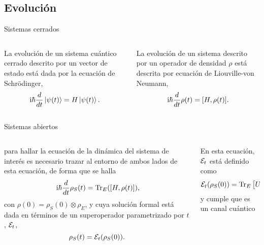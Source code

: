 \subsection{Evolución}
\begin{frame}{Sistemas cerrados}
    \begin{columns}
        \begin{column}{0.5\textwidth}
            La evolución de un sistema cuántico cerrado descrito por un vector de estado está dada por la ecuación de Schrödinger,
            \begin{equation}
                \text{i}\hbar\frac{d}{dt}\ket{\psi(t)}=H\ket{\psi(t)}.\nonumber
            \end{equation}
        \end{column}
        \pause
        \begin{column}{0.5\textwidth}
            La evolución de un sistema descrito por un operador de densidad $\rho$ está descrita por ecuación de Liouville-von Neumann,
            \begin{equation}
                \text{i}\hbar\frac{d}{d t} \rho(t)=[H,\rho(t)].\nonumber
            \end{equation}
        \end{column}
    \end{columns}
\end{frame}

\begin{frame}{Sistemas abiertos}
    \begin{columns}
        \begin{column}{0.5\textwidth}
            para hallar la ecuación de la dinámica del sistema de interés es necesario trazar al entorno de ambos lados de esta ecuación, de forma que se halla
            \begin{align}
                \rmi\hbar\frac{d}{d t} \rho_{S}(t)=\Tr_{E}([H,\rho(t)])\rlap{,}\nonumber
            \end{align}
            con $\rho(0)=\rho_{S}(0)\otimes\rho_{E}$, y cuya solución formal está dada en términos de un superoperador parametrizado por $t$, $\mathcal{E}_{t}$,
                \begin{equation}
                    \rho_{S}(t)=\mathcal{E}_{t}(\rho_{S}(0)).\nonumber
                \end{equation}
        \end{column}
        \pause
        \begin{column}{0.5\textwidth}
            En esta ecuación, $\mathcal{E}_{t}$ está definido como
            \begin{equation}
                \mathcal{E}_{t}(\rho_{S}(0))=\Tr_{E}\qty[U(t,0)\left(\rho_{S}(0)\otimes\rho_{E}\right)U^{\dag}(t,0)],\nonumber
            \end{equation}
            y cumple que es un canal cuántico
        \end{column}
    \end{columns}
\end{frame}

